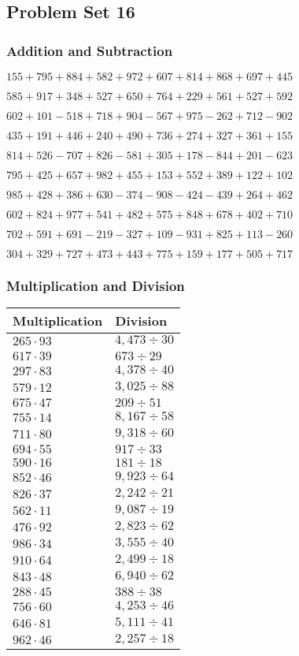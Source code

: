 \hypertarget{problem-set-16-2}{%
\subsection{Problem Set 16}\label{problem-set-16-2}}

\hypertarget{addition-and-subtraction-116}{%
\subsubsection{Addition and
Subtraction}\label{addition-and-subtraction-116}}

\(155 + 795 + 884 + 582 + 972 + 607 + 814 + 868 + 697 + 445\)

\(585 + 917 + 348 + 527 + 650 + 764 + 229 + 561 + 527 + 592\)

\(602 + 101 - 518 + 718 + 904 - 567 + 975 - 262 + 712 - 902\)

\(435 + 191 + 446 + 240 + 490 + 736 + 274 + 327 + 361 + 155\)

\(814 + 526 - 707 + 826 - 581 + 305 + 178 - 844 + 201 - 623\)

\(795 + 425 + 657 + 982 + 455 + 153 + 552 + 389 + 122 + 102\)

\(985 + 428 + 386 + 630 - 374 - 908 - 424 - 439 + 264 + 462\)

\(602 + 824 + 977 + 541 + 482 + 575 + 848 + 678 + 402 + 710\)

\(702 + 591 + 691 - 219 - 327 + 109 - 931 + 825 + 113 - 260\)

\(304 + 329 + 727 + 473 + 443 + 775 + 159 + 177 + 505 + 717\)

\hypertarget{multiplication-and-division-116}{%
\subsubsection{Multiplication and
Division}\label{multiplication-and-division-116}}

\begin{longtable}[]{@{}ll@{}}
\toprule
Multiplication & Division\tabularnewline
\midrule
\endhead
\(265 \cdot 93\) & \(4,473÷30\)\tabularnewline
\(617 \cdot 39\) & \(673÷29\)\tabularnewline
\(297 \cdot 83\) & \(4,378÷40\)\tabularnewline
\(579 \cdot 12\) & \(3,025÷88\)\tabularnewline
\(675 \cdot 47\) & \(209÷51\)\tabularnewline
\(755 \cdot 14\) & \(8,167÷58\)\tabularnewline
\(711 \cdot 80\) & \(9,318÷60\)\tabularnewline
\(694 \cdot 55\) & \(917÷33\)\tabularnewline
\(590 \cdot 16\) & \(181÷18\)\tabularnewline
\(852 \cdot 46\) & \(9,923÷64\)\tabularnewline
\(826 \cdot 37\) & \(2,242÷21\)\tabularnewline
\(562 \cdot 11\) & \(9,087÷19\)\tabularnewline
\(476 \cdot 92\) & \(2,823÷62\)\tabularnewline
\(986 \cdot 34\) & \(3,555÷40\)\tabularnewline
\(910 \cdot 64\) & \(2,499÷18\)\tabularnewline
\(843 \cdot 48\) & \(6,940÷62\)\tabularnewline
\(288 \cdot 45\) & \(388÷38\)\tabularnewline
\(756 \cdot 60\) & \(4,253÷46\)\tabularnewline
\(646 \cdot 81\) & \(5,111÷41\)\tabularnewline
\(962 \cdot 46\) & \(2,257÷18\)\tabularnewline
\bottomrule
\end{longtable}

